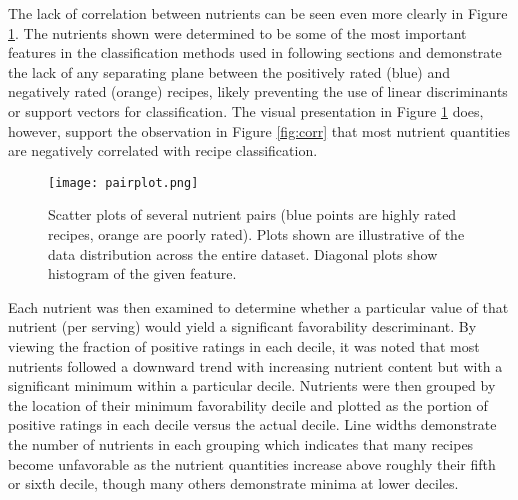 \documentclass[]{scrartcl}
\begin{document}

The lack of correlation between nutrients can be seen even more clearly in Figure \ref{fig:pairplot}.  The nutrients shown were determined to be some of the most important features in the classification methods used in following sections and demonstrate the lack of any separating plane between the positively rated (blue) and negatively rated (orange) recipes, likely preventing the use of linear discriminants or support vectors for classification.  The visual presentation in Figure \ref{fig:pairplot} does, however, support the observation in Figure \ref{fig:corr}  that most nutrient quantities are negatively correlated with recipe classification.

\begin{figure}
	\texttt{[image: pairplot.png]}
	\caption{Scatter plots of several nutrient pairs (blue points are highly rated recipes, orange are poorly rated).  Plots shown are illustrative of the data distribution across the entire dataset.  Diagonal plots show histogram of the given feature.} \label{fig:pairplot}
\end{figure}


Each nutrient was then examined to determine whether a particular value  of that nutrient (per serving) would yield a significant favorability descriminant.  By viewing the fraction of positive ratings in each decile, it was noted that most nutrients followed a downward trend with increasing nutrient content but with a significant minimum within a particular decile.  Nutrients were then grouped by the location of their minimum favorability decile and plotted as the portion of positive ratings in each decile versus the actual decile.  Line widths demonstrate the number of nutrients in each grouping which indicates that many recipes become unfavorable as the nutrient quantities increase above roughly their fifth or sixth decile, though many others demonstrate minima at lower deciles.
\end{document}
